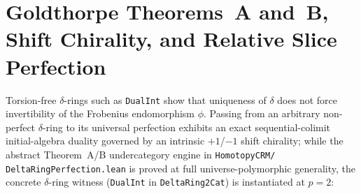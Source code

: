 \section{Goldthorpe Theorems~A and~B, Shift Chirality, and Relative Slice Perfection}\label{sec:slice-perfection}

Torsion-free $\delta$-rings such as \texttt{DualInt} show that uniqueness of $\delta$ does not force invertibility of the Frobenius endomorphism $\phi$. Passing from an arbitrary non-perfect $\delta$-ring to its universal perfection exhibits an exact sequential-colimit initial-algebra duality governed by an intrinsic $+1$/$-1$ shift chirality; while the abstract Theorem~A/B undercategory engine in \texttt{HomotopyCRM/ DeltaRingPerfection.lean} is proved at full universe-polymorphic generality, the concrete $\delta$-ring witness (\texttt{DualInt} in \texttt{DeltaRing2Cat}) is instantiated at $p = 2$:


